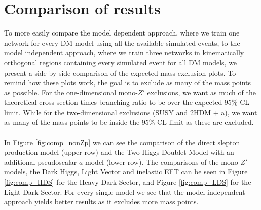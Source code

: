 \documentclass[12pt, a4paper]{book}
\begin{document}
\clearpage
\section{Comparison of results}\label{sec:comparisons_of_methods}
To more easily compare the model dependent approach, where we train one network for every DM model using all the available simulated events, to the model independent approach, where we train three networks in kinematically orthogonal regions containing every simulated event for all DM models, 
we present a side by side comparison of the expected mass exclusion plots. To remind how these plots work, the goal is to exclude as many of the mass points as possible. For the one-dimensional mono-$Z'$ exclusions, we want as much of the theoretical cross-section times branching ratio to be over the expected 95\% CL limit. 
While for the two-dimensional exclusions (SUSY and 2HDM + a), we want as many of the mass points to be inside the 95\% CL limit as these are excluded.\\
\\In Figure \ref{fig:comp_nonZp} we can see the comparison of the direct slepton production model (upper row) and the Two Higgs Doublet Model with an additional pseudoscalar $a$ model (lower row). 
The comparisons of the mono-$Z'$ models, the Dark Higgs, Light Vector and inelastic EFT can be seen in Figure \ref{fig:comp_HDS} for the Heavy Dark Sector, and Figure \ref{fig:comp_LDS} for the Light Dark Sector. For every single model we see that the model independent approach yields better results as it excludes more mass points.
\end{document}
